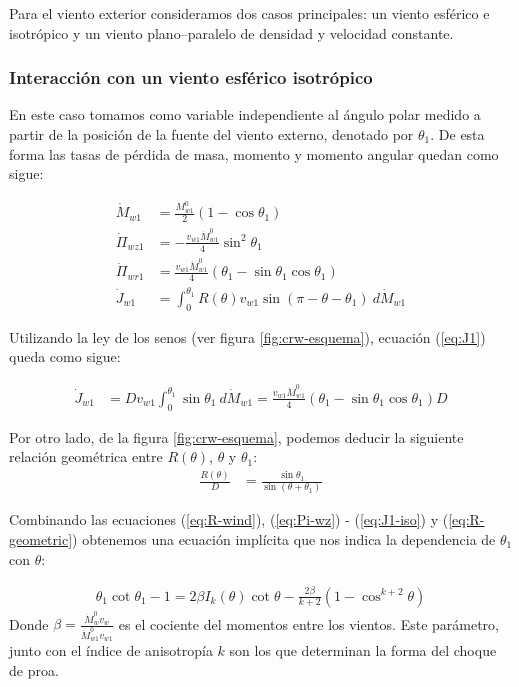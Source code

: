 Para el viento exterior consideramos dos casos principales: un viento esférico e isotrópico y un viento
plano--paralelo de densidad y velocidad constante.

\subsubsection{Interacción con un viento esférico isotrópico}

En este caso tomamos como variable independiente al ángulo polar medido a partir de la posición de la fuente del viento
externo, denotado por $\theta_1$. De esta forma las tasas de pérdida de masa, momento y momento angular quedan como sigue:

\begin{align}
  \dot{M}_{w1} &= \frac{M^0_{w1}}{2}\left(1 - \cos\theta_1\right)\\
  \dot{\Pi}_{wz1} &= -\frac{v_{w1}\dot{M}^0_{w1}}{4}\sin^2\theta_1\\
  \dot{\Pi}_{wr1} &= \frac{v_{w1}\dot{M}^0_{w1}}{4}\left(\theta_1 - \sin\theta_1\cos\theta_1\right)\\
  \dot{J}_{w1} &= \int^{\theta_1}_0 R(\theta)v_{w1}\sin(\pi-\theta-\theta_1)~d\dot{M}_{w1} \label{eq:J1}
\end{align}

Utilizando la ley de los senos (ver figura \ref{fig:crw-esquema}), ecuación (\ref{eq:J1}) queda como sigue:

\begin{align}
  \dot{J}_{w1} &= Dv_{w1}\int^{\theta_1}_0 \sin\theta_1~d\dot{M}_{w1} =
                 \frac{v_{w1}\dot{M}^0_{w1}}{4}\left(\theta_1 - \sin\theta_1\cos\theta_1\right) D \label{eq:J1-iso}
\end{align}

Por otro lado, de la figura \ref{fig:crw-esquema}, podemos deducir la siguiente relación geométrica entre $R(\theta)$,
$\theta$ y $\theta_1$:
\begin{align}
  \frac{R(\theta)}{D} &= \frac{\sin\theta_1}{\sin(\theta+\theta_1)} \label{eq:R-geometric}
\end{align}

Combinando las ecuaciones (\ref{eq:R-wind}), (\ref{eq:Pi-wz}) - (\ref{eq:J1-iso}) y (\ref{eq:R-geometric}) obtenemos una ecuación
implícita que nos indica la dependencia de $\theta_1$ con $\theta$:

\begin{align}
  \theta_1\cot\theta_1 -1 = 2\beta I_k(\theta)\cot\theta - \frac{2\beta}{k+2}\left(1 - \cos^{k+2}\theta\right) \label{eq:th1-th} 
\end{align}
Donde $\beta = \frac{\dot{M}^0_w v_w}{\dot{M}^0_{w1}v_{w1}}$ es el cociente del momentos entre los vientos. Este parámetro, junto con el
índice de anisotropía $k$ son los que determinan la forma del choque de proa. 

